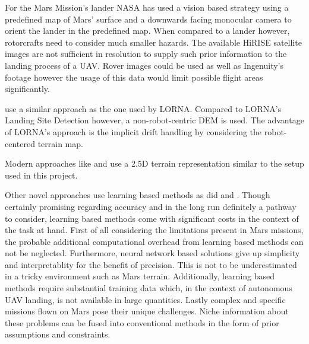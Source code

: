 For the Mars Mission's lander NASA has used a vision based strategy using a predefined map of Mars' surface and a downwards facing monocular camera to orient the lander in the predefined map\citep{Johnson2020Mars2020}. When compared to a lander however, rotorcrafts need to consider much smaller hazards. The available HiRISE satellite images are not sufficient in resolution to supply such prior information to the landing process of a UAV. Rover images could be used as well as Ingenuity's footage however the usage of this data would limit possible flight areas significantly.

\citep{Johnson2005VisionGuided} use a similar approach as the one used by LORNA. Compared to LORNA's Landing Site Detection \citep{LSD1,LSD2} however, a non-robot-centric DEM is used. The advantage of LORNA's approach is the implicit drift handling by considering the robot-centered terrain map.

Modern approaches like \citep{Fankhauser2014RobotCentric, Forster2015Continuous} and \citep{Daftry2018Robust} use a 2.5D terrain representation similar to the setup used in this project.

Other novel approaches use learning based methods as did \citep{Neves2024Multimodal, Abdollahzadeh2022SafeLandingZones} and \citep{TovanchePicon2024RealTimeSafeValidation}. Though certainly promising regarding accuracy and in the long run definitely a pathway to consider, learning based methods come with significant costs in the context of the task at hand. First of all considering the limitations present in Mars missions, the probable additional computational overhead from learning based methods can not be neglected. Furthermore, neural network based solutions give up simplicity and interpretablity for the benefit of precision. This is not to be underestimated in a tricky environment such as Mars terrain. Additionally, learning based methods require substantial training data which, in the context of autonomous UAV landing, is not available in large quantities. Lastly complex and specific missions flown on Mars pose their unique challenges. Niche information about these problems can be fused into conventional methods in the form of prior assumptions and constraints.

% 